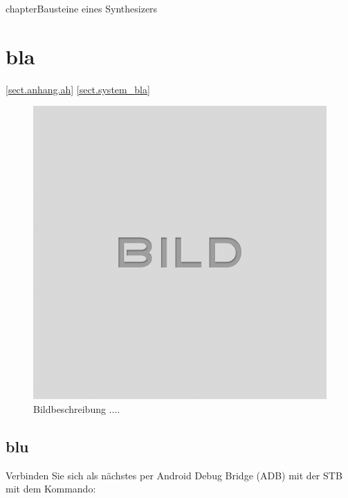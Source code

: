 
chapter{Bausteine eines Synthesizers}\label{chap.bausteine}

\section{bla}\label{sect.system_blie}
\ref{sect.anhang.ah} 
\ref{sect.system_bla}

\begin{figure}[H]
	\centering
	\includegraphics[width=\textwidth]{images/idle.png}
	\caption{Bildbeschreibung ....}
	\label{fig.system.bild3}
\end{figure}

\subsection{blu}\label{sect.system_bloe}



Verbinden Sie sich als nächstes per Android Debug Bridge (ADB) mit der STB mit dem Kommando:
\newline
\newline